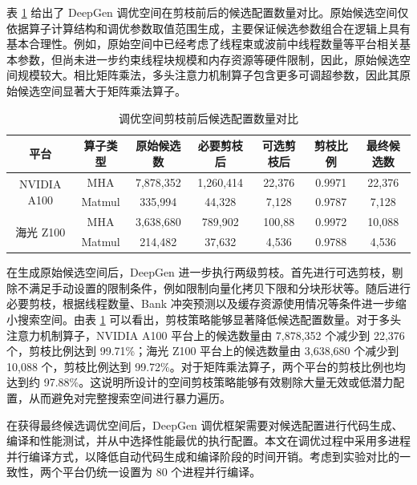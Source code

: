 表 \ref{tab:table_1} 给出了 DeepGen 调优空间在剪枝前后的候选配置数量对比。原始候选空间仅依据算子计算结构和调优参数取值范围生成，主要保证候选参数组合在逻辑上具有基本合理性。例如，原始空间中已经考虑了线程束或波前中线程数量等平台相关基本参数，但尚未进一步约束线程块规模和内存资源等硬件限制，因此，原始候选空间规模较大。相比矩阵乘法，多头注意力机制算子包含更多可调超参数，因此其原始候选空间显著大于矩阵乘法算子。

\begin{table}[htbp]
\caption{调优空间剪枝前后候选配置数量对比}\label{tab:table_1}
\vspace{0.5em}\centering\wuhao
\renewcommand{\arraystretch}{1.35}
\begin{tabular}{ccccccc}
\toprule[1.5pt]
平台 & 算子类型 & 原始候选数 & 必要剪枝后 & 可选剪枝后 & 剪枝比例 & 最终候选数 \\ \midrule[1pt]
\multirow{2}{*}{NVIDIA A100} & MHA & 7,878,352 & 1,260,414 & 22,376 & 0.9971 & 22,376 \\
 & Matmul & 335,994 & 44,328 & 7,128 & 0.9787 & 7,128 \\ 
\multirow{2}{*}{海光 Z100} & MHA & 3,638,680 & 789,902 & 100,88 & 0.9972 & 10,088 \\
 & Matmul & 214,482 & 37,632 & 4,536 & 0.9788 & 4,536\\ \bottomrule[1.5pt]
\end{tabular}
\vspace{\baselineskip}
\end{table}

在生成原始候选空间后，DeepGen 进一步执行两级剪枝。首先进行可选剪枝，剔除不满足手动设置的限制条件，例如限制向量化拷贝下限和分块形状等。随后进行必要剪枝，根据线程数量、Bank 冲突预测以及缓存资源使用情况等条件进一步缩小搜索空间。由表 \ref{tab:table_1} 可以看出，剪枝策略能够显著降低候选配置数量。对于多头注意力机制算子，NVIDIA A100 平台上的候选数量由 7,878,352 个减少到 22,376 个，剪枝比例达到 99.71\%；海光 Z100 平台上的候选数量由 3,638,680 个减少到 10,088 个，剪枝比例达到 99.72\%。对于矩阵乘法算子，两个平台的剪枝比例也均达到约 97.88\%。这说明所设计的空间剪枝策略能够有效剔除大量无效或低潜力配置，从而避免对完整搜索空间进行暴力遍历。

在获得最终候选调优空间后，DeepGen 调优框架需要对候选配置进行代码生成、编译和性能测试，并从中选择性能最优的执行配置。本文在调优过程中采用多进程并行编译方式，以降低自动代码生成和编译阶段的时间开销。考虑到实验对比的一致性，两个平台仍统一设置为 80 个进程并行编译。

